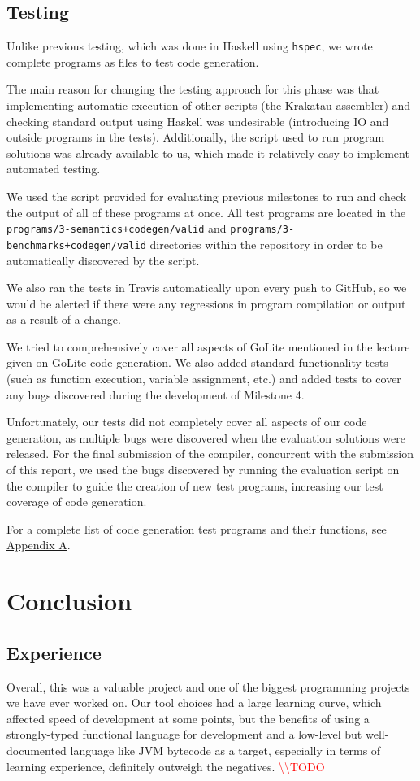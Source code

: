 \documentclass[11pt]{article}
\newcommand{\todo}[0]{\textcolor{red}{\textbackslash\textbackslash TODO \ }}
\begin{document}
\subsection{Testing}
Unlike previous testing, which was done in Haskell using \texttt{hspec}, we
wrote complete programs as files to test code generation.

The main reason for changing the testing approach for this phase was
that
implementing automatic execution of other scripts (the Krakatau assembler) and
checking standard output using Haskell was undesirable (introducing IO
and outside programs in the tests). Additionally, the script used to run
program solutions was already available to us, which made it relatively easy
to implement automated testing.

We used the script provided for evaluating previous milestones to run and check
the output of all of these programs at once. All test programs are located
in the \texttt{programs/3-semantics+codegen/valid} and
\texttt{programs/3-benchmarks+codegen/valid} directories within the repository
in order to be automatically discovered by the script.

We also ran the tests in Travis automatically upon every push to GitHub,
so we would be alerted if there were any regressions in program compilation
or output as a result of a change.

We tried to comprehensively cover all aspects of GoLite mentioned in the
lecture given on GoLite code generation. We also added standard functionality
tests (such as function execution, variable assignment, etc.) and added tests
to cover any bugs discovered during the development of Milestone 4.

Unfortunately, our tests did not completely cover all aspects of our code
generation, as multiple bugs were discovered when the evaluation solutions
were released. For the final submission of the compiler, concurrent with the
submission of this report, we used the bugs discovered by running the evaluation
script on the compiler to guide the creation of new test programs, increasing our
test coverage of code generation.

For a complete list of code generation test programs and their functions, see
\hyperref[sec:appendixa]{Appendix A}.

\section{Conclusion}
\subsection{Experience}
Overall, this was a valuable project and one of the biggest programming projects
we have ever worked on. Our tool choices had a large learning curve, which
affected speed of development at some points, but the benefits of using a
strongly-typed functional language for development and a low-level but
well-documented language like JVM bytecode as a target, especially in terms of
learning experience, definitely outweigh the negatives. \todo
\end{document}
